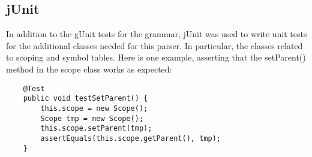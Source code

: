 \subsection{jUnit}
In addition to the gUnit tests for the grammar, jUnit was used to write unit tests for
the additional classes needed for this parser. In particular, the classes
related to scoping and symbol tables. Here is one example, asserting that the
setParent() method in the scope class works as expected:
\begin{verbatim}
    @Test
    public void testSetParent() {
        this.scope = new Scope();
        Scope tmp = new Scope();
        this.scope.setParent(tmp);
        assertEquals(this.scope.getParent(), tmp);
    }
\end{verbatim}
